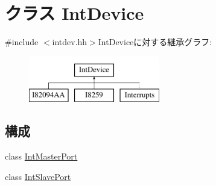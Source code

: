 \hypertarget{classX86ISA_1_1IntDevice}{
\section{クラス IntDevice}
\label{classX86ISA_1_1IntDevice}
}


{\ttfamily \#include $<$intdev.hh$>$}IntDeviceに対する継承グラフ:\begin{figure}[H]
\begin{center}
\leavevmode
\includegraphics[height=2cm]{classX86ISA_1_1IntDevice}
\end{center}
\end{figure}
\subsection*{構成}
\begin{DoxyCompactItemize}
\item 
class \hyperlink{classX86ISA_1_1IntDevice_1_1IntMasterPort}{IntMasterPort}
\item 
class \hyperlink{classX86ISA_1_1IntDevice_1_1IntSlavePort}{IntSlavePort}
\end{DoxyCompactItemize}
